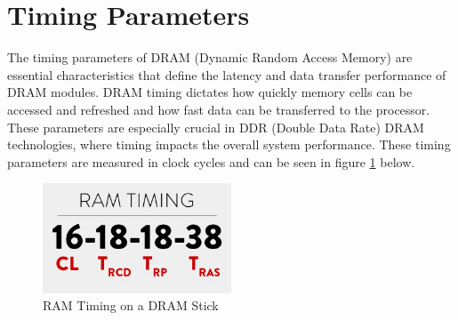 \documentclass[12pt]{article}
\begin{document}
\newpage %



\section{Timing Parameters}
The timing parameters of DRAM (Dynamic Random Access Memory) are essential characteristics that define the latency and data transfer performance of DRAM modules. DRAM timing dictates how quickly memory cells can be accessed and refreshed and how fast data can be transferred to the processor. These parameters are especially crucial in DDR (Double Data Rate) DRAM technologies, where timing impacts the overall system performance. These timing parameters are measured in clock cycles and can be seen in figure \ref{fig:RAMTiming} below.


\begin{figure}[H]
	\centering
		\includegraphics[width=0.5\textwidth]{./images/RAMTiming.png}
	\caption{RAM Timing on a DRAM Stick }
	\label{fig:RAMTiming}
\end{figure}
\end{document}
